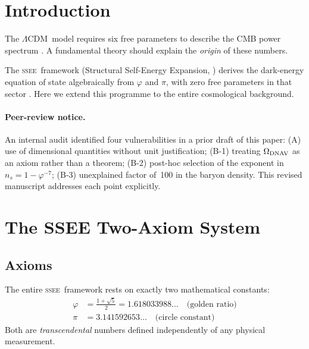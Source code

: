\documentclass[12pt,a4paper]{article}
\newcommand{\SSEE}{\ifmmode\mathrm{SSEE}\else\textsc{ssee}\fi}
\newcommand{\LCDM}{\ifmmode\Lambda\mathrm{CDM}\else$\Lambda$CDM\fi}
\begin{document}
\tableofcontents

\section{Introduction}

The \LCDM\ model requires six free parameters to describe the CMB power
spectrum \citep{PlanckCollaboration2020a}.  A fundamental theory should
explain the \emph{origin} of these numbers.

The \SSEE\ framework (Structural Self-Energy Expansion,
\citep{AlmeidaSSEE2026genesis}) derives the dark-energy equation of state
algebraically from $\varphi$ and $\pi$, with zero free parameters in that
sector \citep{AlmeidaSSEE2026paper1,AlmeidaSSEE2026paper2,AlmeidaSSEE2026paper3}.
Here we extend this programme to the entire cosmological background.

\paragraph{Peer-review notice.}
An internal audit identified four vulnerabilities in a prior draft of this paper:
(A) use of dimensional quantities without unit justification;
(B-1) treating $\Omega_{\rm DNAV}$ as an axiom rather than a theorem;
(B-2) post-hoc selection of the exponent in $n_s = 1-\varphi^{-7}$;
(B-3) unexplained factor of~100 in the baryon density.
This revised manuscript addresses each point explicitly.

\section{The SSEE Two-Axiom System}
\label{sec:constants}

\subsection{Axioms}

The entire \SSEE\ framework rests on exactly two mathematical constants:
\begin{align}
\varphi &= \frac{1+\sqrt{5}}{2} = 1.618033988\ldots
          \quad\text{(golden ratio)} \\
\pi     &= 3.141592653\ldots
          \quad\text{(circle constant)}
\end{align}
Both are \emph{transcendental} numbers defined independently of any physical
measurement.
\end{document}
